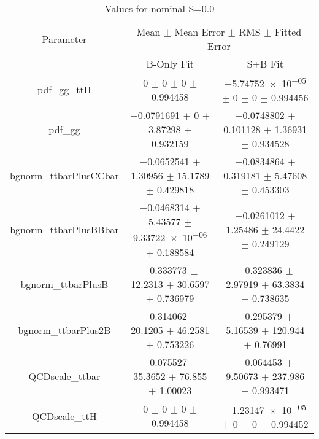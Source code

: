 \begin{table}
\centering
\caption{Values for nominal S=0.0}
\begin{tabular}{ccc}
\toprule
Parameter & \multicolumn{2}{c}{Mean $\pm$ Mean Error $\pm$ RMS $\pm$ Fitted Error}\\
 & B-Only Fit & S+B Fit\\
\midrule
pdf\_gg\_ttH & \num{0} $\pm$ \num{0} $\pm$ \num{0} $\pm$ \num{0.994458} & \num{-5.74752e-05} $\pm$ \num{0} $\pm$ \num{0} $\pm$ \num{0.994456}\\
pdf\_gg & \num{-0.0791691} $\pm$ \num{0} $\pm$ \num{3.87298} $\pm$ \num{0.932159} & \num{-0.0748802} $\pm$ \num{0.101128} $\pm$ \num{1.36931} $\pm$ \num{0.934528}\\
bgnorm\_ttbarPlusCCbar & \num{-0.0652541} $\pm$ \num{1.30956} $\pm$ \num{15.1789} $\pm$ \num{0.429818} & \num{-0.0834864} $\pm$ \num{0.319181} $\pm$ \num{5.47608} $\pm$ \num{0.453303}\\
bgnorm\_ttbarPlusBBbar & \num{-0.0468314} $\pm$ \num{5.43577} $\pm$ \num{9.33722e-06} $\pm$ \num{0.188584} & \num{-0.0261012} $\pm$ \num{1.25486} $\pm$ \num{24.4422} $\pm$ \num{0.249129}\\
bgnorm\_ttbarPlusB & \num{-0.333773} $\pm$ \num{12.2313} $\pm$ \num{30.6597} $\pm$ \num{0.736979} & \num{-0.323836} $\pm$ \num{2.97919} $\pm$ \num{63.3834} $\pm$ \num{0.738635}\\
bgnorm\_ttbarPlus2B & \num{-0.314062} $\pm$ \num{20.1205} $\pm$ \num{46.2581} $\pm$ \num{0.753226} & \num{-0.295379} $\pm$ \num{5.16539} $\pm$ \num{120.944} $\pm$ \num{0.76991}\\
QCDscale\_ttbar & \num{-0.075527} $\pm$ \num{35.3652} $\pm$ \num{76.855} $\pm$ \num{1.00023} & \num{-0.064453} $\pm$ \num{9.50673} $\pm$ \num{237.986} $\pm$ \num{0.993471}\\
QCDscale\_ttH & \num{0} $\pm$ \num{0} $\pm$ \num{0} $\pm$ \num{0.994458} & \num{-1.23147e-05} $\pm$ \num{0} $\pm$ \num{0} $\pm$ \num{0.994452}\\
\bottomrule
\end{tabular}
\end{table}